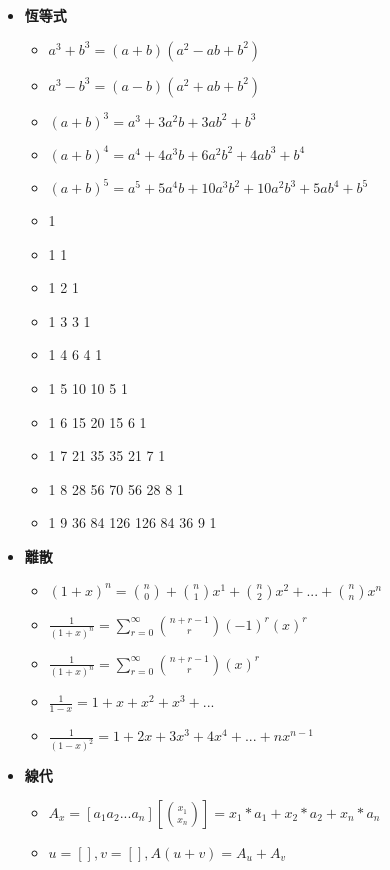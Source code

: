 \begin{itemize}
  \item \textbf{恆等式}
  \begin{itemize}
    \item $a^3+b^3 = (a+b)(a^2-ab+b^2)$
    \item $a^3-b^3 = (a-b)(a^2+ab+b^2)$
    \item $(a+b)^3 = a^3+3a^2b+3ab^2+b^3$
    \item $(a+b)^4 = a^4+4a^3b+6a^2b^2+4ab^3+b^4$
    \item $(a+b)^5 = a^5+5a^4b+10a^3b^2+10a^2b^3+5ab^4+b^5$
    \item                   1
    \item                 1   1
    \item               1   2   1
    \item             1   3   3   1
    \item           1   4   6   4   1
    \item         1   5  10  10   5   1
    \item       1   6  15  20  15   6   1
    \item     1   7  21  35  35  21   7   1
    \item   1   8  28  56  70  56  28   8   1
    \item 1   9  36  84 126 126  84  36   9   1

  \end{itemize}

 

\item \textbf{離散}
  \begin{itemize}
    \item $(1+x)^n = \binom{n}{0} + \binom{n}{1}x^1 + \binom{n}{2}x^2 + ...+\binom{n}{n}x^n$
    \item $\frac{1}{(1+x)^n} = \sum \limits_{r=0}^\infty \binom{n+r-1}{r}(-1)^r(x)^r$
    \item $\frac{1}{(1+x)^n} = \sum \limits_{r=0}^\infty \binom{n+r-1}{r}(x)^r$
    \item $\frac{1}{1-x} = 1+x+x^2+x^3+...$
    \item $\frac{1}{(1-x)^2} = 1+2x+3x^3+4x^4+...+nx^{n-1}$
  \end{itemize}
  
\item \textbf{線代}
  \begin{itemize}
    \item $A_x = [a_1 a_2 ... a_n][\binom{x_1}{x_n}] = x_1*a_1+x_2*a_2+x_n*a_n$
    \item $u=[], v=[], A(u+v) = A_u+A_v$
  \end{itemize}


\end{itemize}
